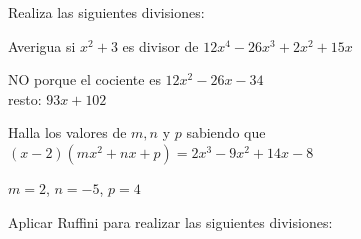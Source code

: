 \documentclass[spanish, 12pt]{exam}
\begin{document}
\begin{questions}


\question Realiza las siguientes divisiones:

\question Averigua si ${x^2} + 3$ es divisor de $12{x^4} - 26{x^3} + 2{x^2} + 15x$
\begin{solution} NO porque el cociente es $12x^2-26x-34$ \\ resto: $93x+102$ \end{solution}

\question Halla los valores de $m, n$ y $p$ sabiendo que $\left( {x - 2} \right)\left( {m{x^2} + nx + p} \right) = 2{x^3} - 9{x^2} + 14x - 8$
\begin{solution} $m=2$, $n=-5$, $p=4$ \end{solution}


\question Aplicar Ruffini para realizar las siguientes divisiones:
\begin{multicols}{2}
\end{multicols}



\end{questions}
\end{document}
